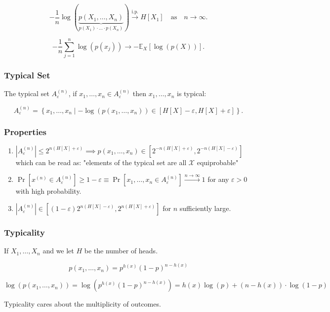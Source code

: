 \begin{equation*}
-\frac{1}{n}\log\left(\underbrace{p(X_1,\ldots,X_n)}_{p(X_1) \cdot \ldots \cdot p(X_n)}\right) \xrightarrow{\text{i.p.}}  H[X_1] \quad \text{as} \quad n \to \infty.
\end{equation*}

\begin{equation*}
-\frac{1}{n} \sum_{j=1}^n \log(p(x_j)) \to -\mathbb{E}_X[\log(p(X))].
\end{equation*}

\subsubsection{Typical Set}

The typical set \( A_{\varepsilon}^{(n)} \), if \( x_1, \ldots, x_n \in A_{\varepsilon}^{(n)} \) then \( x_1, \ldots, x_n \) is typical:

\begin{equation*}
A_{\varepsilon}^{(n)} = \left\{x_1, \ldots, x_n \mid -\log(p(x_1, \ldots, x_n)) \in [H[X] - \varepsilon, H[X] + \varepsilon]\right\}.
\end{equation*}

\subsubsection{Properties}

\begin{enumerate}
    \item \( \left|A_{\varepsilon}^{(n)}\right| \leq 2^{n(H[X]+\varepsilon)} \implies p(x_1, \ldots, x_n) \in [2^{-n(H[X] + \varepsilon)}, 2^{-n(H[X] - \varepsilon)}] \) which can be read as: "elements of the typical set are all \( \mathcal{X} \) equiprobable"
    \item \( \Pr\left[x^{(n)} \in A_{\varepsilon}^{(n)}\right] \geq 1-\varepsilon \equiv \Pr\left[x_1, \ldots, x_n \in A_{\varepsilon}^{(n)}\right] \xrightarrow{n \to \infty} 1 \) for any \( \varepsilon > 0 \) with high probability.
    \item \( \left|A_{\varepsilon}^{(n)}\right| \in [(1-\varepsilon) 2^{n(H[X] - \varepsilon)}, 2^{n(H[X] + \varepsilon)}] \) for \( n \) sufficiently large.
\end{enumerate}

\subsubsection{Typicality}

If \( X_1, \ldots, X_n \) and we let \( H \) be the number of heads.

\begin{equation*}
p(x_1, \ldots, x_n) = p^{h(x)} (1-p)^{n - h(x)}
\end{equation*}

\begin{equation*}
\log(p(x_1, \ldots, x_n)) = \log\left(p^{h(x)} (1-p)^{n - h(x)}\right) = h(x)\log(p) + (n - h(x)) \cdot \log(1 - p)
\end{equation*}

Typicality cares about the multiplicity of outcomes.
